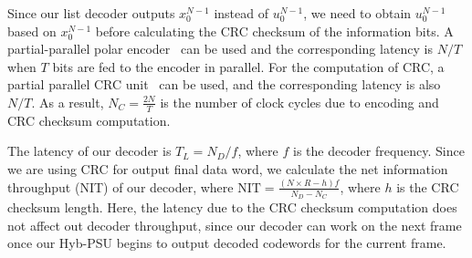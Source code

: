 \documentclass[journal]{IEEEtran}
\begin{document}
Since our list decoder outputs $x_0^{N-1}$ instead of $u_0^{N-1}$, we need to obtain $u_0^{N-1}$ based on $x_0^{N-1}$ before calculating the CRC checksum of the information bits. A partial-parallel polar encoder~\cite{polar_encoder} can be used and the corresponding latency is $N/T$ when $T$ bits are fed to the encoder in parallel. For the computation of CRC, a partial parallel CRC unit~\cite{crc_lanman2015} can be used, and the corresponding latency is also $N/T$. As a result, $N_C=\frac{2N}{T}$ is the number of clock cycles due to encoding and CRC checksum computation.

The latency of our decoder is $T_L = N_D/f$, where $f$ is the decoder frequency. Since we are using CRC for output final data word, we calculate the net information throughput (NIT) of our decoder, where $\mbox{NIT}=\frac{(N\times R-h)f}{N_D-N_C}$, where $h$ is the CRC checksum length. Here, the latency due to the CRC checksum computation does not affect out decoder throughput, since our decoder can work on the next frame once our Hyb-PSU begins to output decoded codewords for the current frame.
\end{document}
